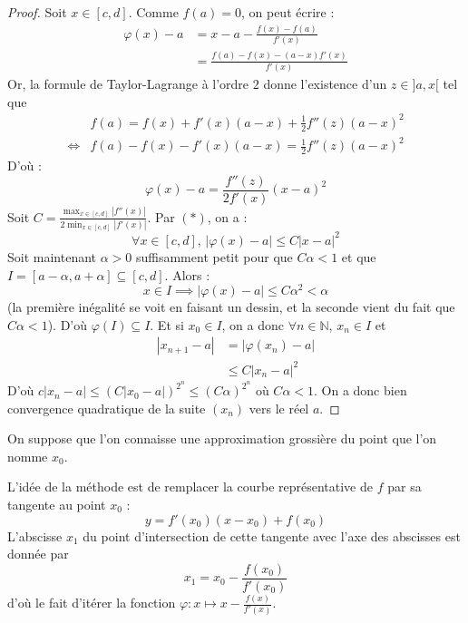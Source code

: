 	\begin{proof}
		Soit $x \in [c, d]$. Comme $f(a) = 0$, on peut écrire :
		\begin{align*}
			\varphi(x) - a &= x - a - \frac{f(x) - f(a)}{f'(x)} \\
			&= \frac{f(a) - f(x) - (a-x)f'(x)}{f'(x)}
		\end{align*}
		Or, la formule de Taylor-Lagrange à l'ordre $2$ donne l'existence d'un $z \in ]a, x[$ tel que
		\begin{align*}
			&f(a) = f(x) + f'(x)(a-x) + \frac{1}{2} f''(z)(a-x)^2 \\
			\iff& f(a) - f(x) - f'(x)(a-x)  = \frac{1}{2} f''(z)(a-x)^2
		\end{align*}
		D'où :
		\[ \varphi(x) - a = \frac{f''(z)}{2f'(x)}(x-a)^2 \tag{$*$} \]
		Soit $C = \frac{\max_{x \in [c, d]} |f''(x)|}{2\min_{x \in [c, d]} |f'(x)|}$. Par $(*)$, on a :
		\[ \forall x \in [c, d], \, |\varphi(x)-a| \leq C |x-a|^2 \]
		Soit maintenant $\alpha > 0$ suffisamment petit pour que $C\alpha < 1$ et que $I = [a - \alpha, a + \alpha] \subseteq [c, d]$. Alors :
		\[ x \in I \implies |\varphi(x) - a| \leq C\alpha^2 < \alpha \]
		(la première inégalité se voit en faisant un dessin, et la seconde vient du fait que $C\alpha < 1$). D'où $\varphi(I) \subseteq I$. Et si $x_0 \in I$, on a donc $\forall n \in \mathbb{N}$, $x_n \in I$ et
		\begin{align*}
			|x_{n+1} - a| &= |\varphi(x_n) - a| \\
			&\leq C |x_n - a|^2
		\end{align*}
		D'où $c |x_n - a| \leq (C |x_0 - a|)^{2^n} \leq (C \alpha)^{2^n}$ où $C \alpha < 1$. On a donc bien convergence quadratique de la suite $(x_n)$ vers le réel $a$.
	\end{proof}


	\begin{remark}
		On suppose que l'on connaisse une approximation grossière du point que l'on nomme $x_0$.
		\begin{center}
		\end{center}
		L'idée de la méthode est de remplacer la courbe représentative de $f$ par sa tangente au point $x_0$ :
		\[ y = f'(x_0)(x-x_0) + f(x_0) \]
		L'abscisse $x_1$ du point d'intersection de cette tangente avec l'axe des abscisses est donnée par
		\[ x_1 = x_0 - \frac{f(x_0)}{f'(x_0)} \]
		d'où le fait d'itérer la fonction $\varphi : x \mapsto x - \frac{f(x)}{f'(x)}$.
	\end{remark}

